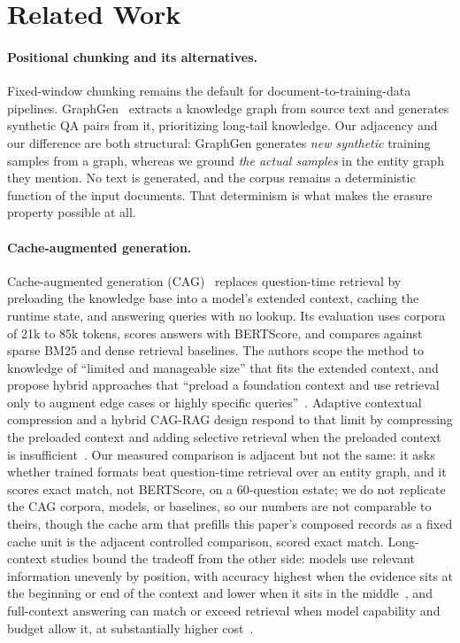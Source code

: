 \documentclass{article}
\begin{document}
\section{Related Work}
\label{sec:related}

\paragraph{Positional chunking and its alternatives.}
Fixed-window chunking remains the default for document-to-training-data pipelines. GraphGen~\cite{chen2025graphgen} extracts a knowledge graph from source text and generates synthetic QA pairs from it, prioritizing long-tail knowledge. Our adjacency and our difference are both structural: GraphGen generates \emph{new synthetic} training samples from a graph, whereas we ground \emph{the actual samples} in the entity graph they mention. No text is generated, and the corpus remains a deterministic function of the input documents. That determinism is what makes the erasure property possible at all.

\paragraph{Cache-augmented generation.}
Cache-augmented generation (CAG)~\cite{chan2024cag} replaces question-time retrieval by preloading the knowledge base into a model's extended context, caching the runtime state, and answering queries with no lookup. Its evaluation uses corpora of 21k to 85k tokens, scores answers with BERTScore, and compares against sparse BM25 and dense retrieval baselines. The authors scope the method to knowledge of ``limited and manageable size'' that fits the extended context, and propose hybrid approaches that ``preload a foundation context and use retrieval only to augment edge cases or highly specific queries''~\cite{chan2024cag}. Adaptive contextual compression and a hybrid CAG-RAG design respond to that limit by compressing the preloaded context and adding selective retrieval when the preloaded context is insufficient~\cite{agrawal2025acc}. Our measured comparison is adjacent but not the same: it asks whether trained formats beat question-time retrieval over an entity graph, and it scores exact match, not BERTScore, on a 60-question estate; we do not replicate the CAG corpora, models, or baselines, so our numbers are not comparable to theirs, though the cache arm that prefills this paper's composed records as a fixed cache unit is the adjacent controlled comparison, scored exact match. Long-context studies bound the tradeoff from the other side: models use relevant information unevenly by position, with accuracy highest when the evidence sits at the beginning or end of the context and lower when it sits in the middle~\cite{liu2023lost}, and full-context answering can match or exceed retrieval when model capability and budget allow it, at substantially higher cost~\cite{li2024raglc}.
\end{document}
